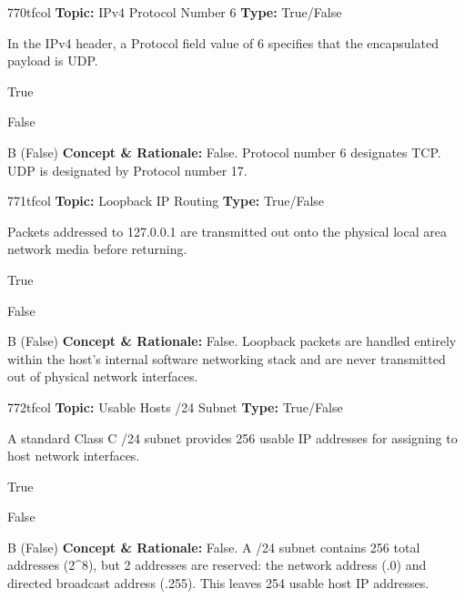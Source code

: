 \begin{qcard}{770}{tfcol}
\textcolor{darkslate!75}{\small\textbf{Topic:} IPv4 Protocol Number 6 \hfill \textbf{Type:} True/False}\vspace{0.4em}\par
In the IPv4 header, a Protocol field value of 6 specifies that the encapsulated payload is UDP.
\begin{qoptions}
\item True
\item False
\end{qoptions}
\end{qcard}
\nopagebreak
\begin{explainbox}{B (False)}
\textbf{Concept \& Rationale:} False. Protocol number 6 designates TCP. UDP is designated by Protocol number 17.
\end{explainbox}

\begin{qcard}{771}{tfcol}
\textcolor{darkslate!75}{\small\textbf{Topic:} Loopback IP Routing \hfill \textbf{Type:} True/False}\vspace{0.4em}\par
Packets addressed to 127.0.0.1 are transmitted out onto the physical local area network media before returning.
\begin{qoptions}
\item True
\item False
\end{qoptions}
\end{qcard}
\nopagebreak
\begin{explainbox}{B (False)}
\textbf{Concept \& Rationale:} False. Loopback packets are handled entirely within the host's internal software networking stack and are never transmitted out of physical network interfaces.
\end{explainbox}

\begin{qcard}{772}{tfcol}
\textcolor{darkslate!75}{\small\textbf{Topic:} Usable Hosts /24 Subnet \hfill \textbf{Type:} True/False}\vspace{0.4em}\par
A standard Class C /24 subnet provides 256 usable IP addresses for assigning to host network interfaces.
\begin{qoptions}
\item True
\item False
\end{qoptions}
\end{qcard}
\nopagebreak
\begin{explainbox}{B (False)}
\textbf{Concept \& Rationale:} False. A /24 subnet contains 256 total addresses (2\textasciicircum{}8), but 2 addresses are reserved: the network address (.0) and directed broadcast address (.255). This leaves 254 usable host IP addresses.
\end{explainbox}

